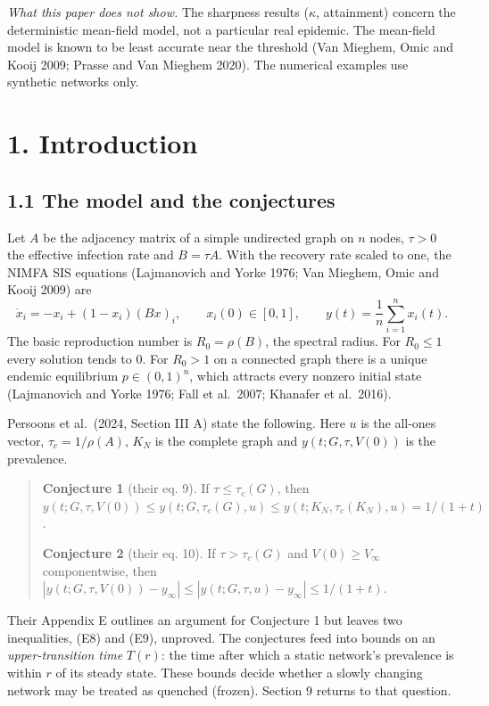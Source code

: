 \documentclass[
  11pt,
  a4paper,
]{article}
\begin{document}
\emph{What this paper does not show.} The sharpness results (\(\kappa\),
attainment) concern the deterministic mean-field model, not a particular
real epidemic. The mean-field model is known to be least accurate near
the threshold (Van Mieghem, Omic and Kooij 2009; Prasse and Van Mieghem
2020). The numerical examples use synthetic networks only.

\section{1. Introduction}\label{introduction}

\subsection{1.1 The model and the
conjectures}\label{the-model-and-the-conjectures}

Let \(A\) be the adjacency matrix of a simple undirected graph on \(n\)
nodes, \(\tau>0\) the effective infection rate and \(B=\tau A\). With
the recovery rate scaled to one, the NIMFA SIS equations (Lajmanovich
and Yorke 1976; Van Mieghem, Omic and Kooij 2009) are \[
\dot x_i=-x_i+(1-x_i)(Bx)_i,\qquad x_i(0)\in[0,1],\qquad y(t)=\frac1n\sum_{i=1}^n x_i(t). \tag{1.1}
\] The basic reproduction number is \(R_0=\rho(B)\), the spectral
radius. For \(R_0\le1\) every solution tends to \(0\). For \(R_0>1\) on
a connected graph there is a unique endemic equilibrium \(p\in(0,1)^n\),
which attracts every nonzero initial state (Lajmanovich and Yorke 1976;
Fall et al.~2007; Khanafer et al.~2016).

Persoons et al.~(2024, Section III A) state the following. Here \(u\) is
the all-ones vector, \(\tau_c=1/\rho(A)\), \(K_N\) is the complete graph
and \(y(t;G,\tau,V(0))\) is the prevalence.

\begin{quote}
\textbf{Conjecture 1} (their eq. 9). If \(\tau\le\tau_c(G)\), then
\(y(t;G,\tau,V(0))\le y(t;G,\tau_c(G),u)\le y(t;K_N,\tau_c(K_N),u)=1/(1+t)\).

\textbf{Conjecture 2} (their eq. 10). If \(\tau>\tau_c(G)\) and
\(V(0)\ge V_\infty\) componentwise, then
\(|y(t;G,\tau,V(0))-y_\infty|\le|y(t;G,\tau,u)-y_\infty|\le 1/(1+t)\).
\end{quote}

Their Appendix E outlines an argument for Conjecture 1 but leaves two
inequalities, (E8) and (E9), unproved. The conjectures feed into bounds
on an \emph{upper-transition time} \(T(r)\): the time after which a
static network's prevalence is within \(r\) of its steady state. These
bounds decide whether a slowly changing network may be treated as
quenched (frozen). Section 9 returns to that question.
\end{document}
